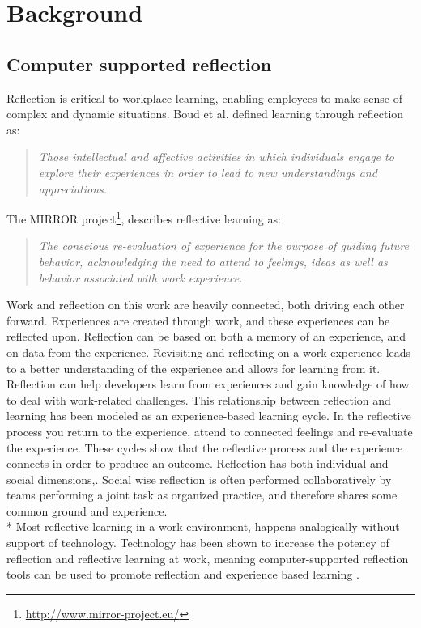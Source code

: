 \chapter{Background}
\label{chap:background}
\section{Computer supported reflection}
Reflection is critical to workplace learning, enabling employees to make sense of complex and dynamic situations\citep{Schon1983}. Boud et al.\citep{boudreflection1985} defined learning through reflection as: 
\begin{quote}
\emph{Those intellectual and affective activities in which individuals engage to explore their experiences in order to lead to new understandings and appreciations.}
\end{quote}
The MIRROR project\footnote{\url{http://www.mirror-project.eu/}}, describes reflective learning as:
\begin{quote}
\emph{The conscious re-evaluation of experience for the purpose of guiding future behavior, acknowledging the need to attend to feelings, ideas as well as behavior associated with work experience.}\citep{krogstiemodel}
\end{quote}

Work and reflection on this work are heavily connected\citep{Schon1983}, both driving each other forward. Experiences are created through work, and these experiences can be reflected upon. Reflection can be based on both a memory of an experience, and on data from the experience. Revisiting and reflecting on a work experience leads to a better understanding of the experience and allows for learning from it. Reflection can help developers learn from experiences and gain knowledge of how to deal with work-related challenges. This relationship between reflection and learning has been modeled as an experience-based learning cycle\citep{boudreflection1985,Korthagen_Vasalos_2005, KolbModel}. In the reflective process you return to the experience, attend to connected feelings and re-evaluate
the experience. These cycles show that the reflective process and the experience connects in order to produce an outcome.
Reflection has both individual and social dimensions,\citep{Høyrup_2004,Woerkom_Croon_2008}. Social wise reflection is often performed collaboratively by teams performing a joint task as organized practice, and therefore shares some common ground and experience. \\*
Most reflective learning in a work environment, happens analogically without support of technology\citep{Schindler_Eppler_2003}. Technology has been shown to increase the potency of reflection and reflective learning at work, meaning computer-supported reflection tools can be used to promote reflection and experience based learning \citep{krogstiereflectionwork, Lin_Hmelo_Kinzer_Secules_1999,Xiao_Clark_Rosson_Carroll_2008}. 

